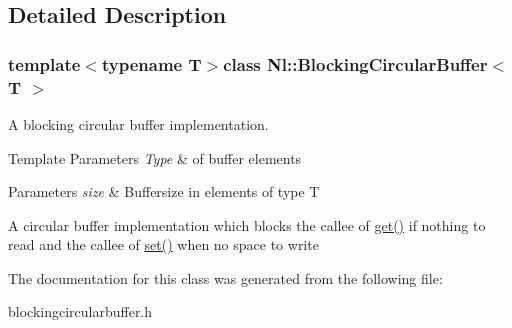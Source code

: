 \subsection{Detailed Description}
\subsubsection*{template$<$typename T$>$class Nl\+::\+Blocking\+Circular\+Buffer$<$ T $>$}

A blocking circular buffer implementation. 


\begin{DoxyTemplParams}{Template Parameters}
{\em Type} & of buffer elements \\
\hline
\end{DoxyTemplParams}

\begin{DoxyParams}{Parameters}
{\em size} & Buffersize in elements of type T\\
\hline
\end{DoxyParams}
A circular buffer implementation which blocks the callee of \hyperlink{group__Audio_ga3923df13e2115ece2a5f4969a9b2f890}{get()} if nothing to read and the callee of \hyperlink{group__Audio_gab60ad480d2ebe4b2aa526d31d808be7a}{set()} when no space to write 

The documentation for this class was generated from the following file\+:\begin{DoxyCompactItemize}
\item 
blockingcircularbuffer.\+h\end{DoxyCompactItemize}
